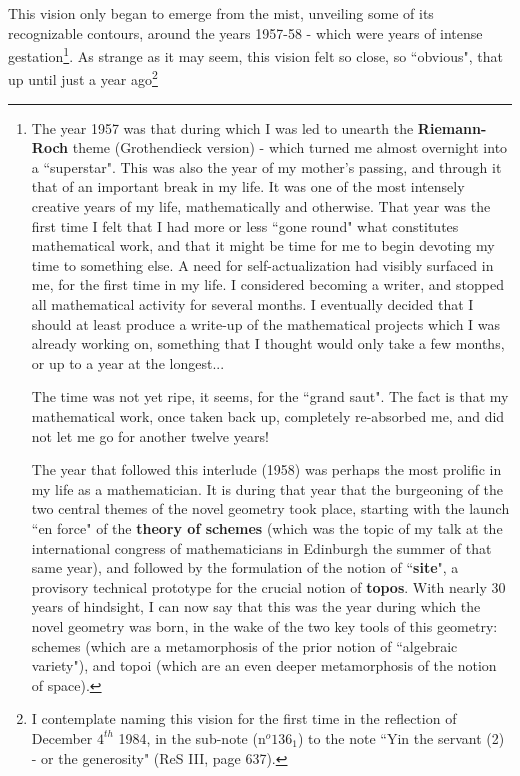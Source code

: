 This vision only began to emerge from the mist, unveiling some of its recognizable contours, around the years 1957-58 - which were years of intense gestation\footnote{The year 1957 was that during which I was led to unearth the \textbf{Riemann-Roch} theme (Grothendieck version) - which turned me almost overnight into a ``superstar". This was also the year of my mother's passing, and through it that of an important break in my life. It was one of the most intensely creative years of my life, mathematically and otherwise. That year was the first time I felt that I had more or less ``gone round" what constitutes mathematical work, and that it might be time for me to begin devoting my time to something else. A need for self-actualization had visibly surfaced in me, for the first time in my life. I considered becoming a writer, and stopped all mathematical activity for several months. I eventually decided that I should at least produce a write-up of the mathematical projects which I was already working on, something that I thought would only take a few months, or up to a year at the longest...

The time was not yet ripe, it seems, for the ``grand saut". The fact is that my mathematical work, once taken back up, completely re-absorbed me, and did not let me go for another twelve years!

The year that followed this interlude (1958) was perhaps the most prolific in my life as a mathematician. It is during that year that the burgeoning of the two central themes of the novel geometry took place, starting with the launch ``en force" of the \textbf{theory of schemes} (which was the topic of my talk at the international congress of mathematicians in Edinburgh the summer of that same year), and followed by the formulation of the notion of ``\textbf{site}", a provisory technical prototype for the crucial notion of \textbf{topos}. With nearly 30 years of hindsight, I can now say that this was the year during which the novel geometry was born, in the wake of the two key tools of this geometry: schemes (which are a metamorphosis of the prior notion of ``algebraic variety"), and topoi (which are an even deeper metamorphosis of the notion of space).}. As strange as it may seem, this vision felt so close, so  ``obvious", that up until just a year ago\footnote{I contemplate naming this vision for the first time in the reflection of December $4^{th}$ 1984, in the sub-note (n$^o 136_1$) to the note ``Yin the servant (2) - or the generosity" (ReS III, page 637).}
